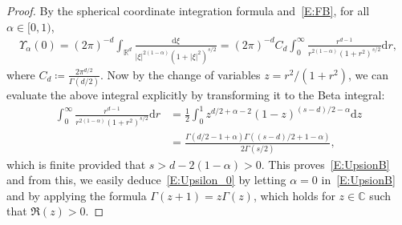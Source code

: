\documentclass[sn-mathphys]{sn-jnl}%
\newcommand{\BR}{\mathbb{R}}
\newcommand{\ud}{\ensuremath{\mathrm{d}}}
\numberwithin{equation}{section}
\theoremstyle{thmstyleone}%
\theoremstyle{thmstyletwo}%
\theoremstyle{thmstylethree}%
\begin{document}
\begin{proof}
  By the spherical coordinate integration formula and~\eqref{E:FB}, for all $\alpha\in[0,1)$,
  \begin{align*}
    \Upsilon_\alpha(0) = \left(2\pi\right)^{-d} \int_{\BR^d} \frac{\ud\xi}{\lvert\xi\rvert^{2(1-\alpha)}\left(1+\lvert\xi\rvert^2\right)^{s/2}}
    = \left(2\pi\right)^{-d} C_d \int_0^\infty \frac{r^{d-1}}{r^{2(1-\alpha)}\left(1+r^2\right)^{s/2}} \ud r,
  \end{align*}
  where $C_d\coloneqq \frac{2\pi^{d/2}}{\Gamma\left(d/2\right)}$. Now by the change of variables
  $z = r^2 /(1+r^2)$, we can evaluate the above integral explicitly by transforming it to the Beta
  integral:
  \begin{align*}
    \int_0^\infty \frac{r^{d-1}}{r^{2(1-\alpha)}\left(1+r^2\right)^{s/2}} \ud r
     & = \frac{1}{2} \int_0^1 z^{d/2+\alpha-2}(1-z)^{(s-d)/2-\alpha}\ud z \\
     & = \frac{\Gamma\left(d/2-1+\alpha\right)\Gamma\left((s-d)/2+1-\alpha\right)}{2\Gamma(s/2)},
  \end{align*}
  which is finite provided that $s>d-2(1-\alpha)>0$. This proves~\eqref{E:UpsionB} and from this, we
  easily deduce~\eqref{E:Upsilon_0} by letting $\alpha = 0$ in~\eqref{E:UpsionB} and by applying the
  formula $\Gamma(z+1) = z\Gamma(z)$, which holds for $z\in \mathbb{C}$ such that $\Re(z)>0$.


\end{proof}
\end{document}
